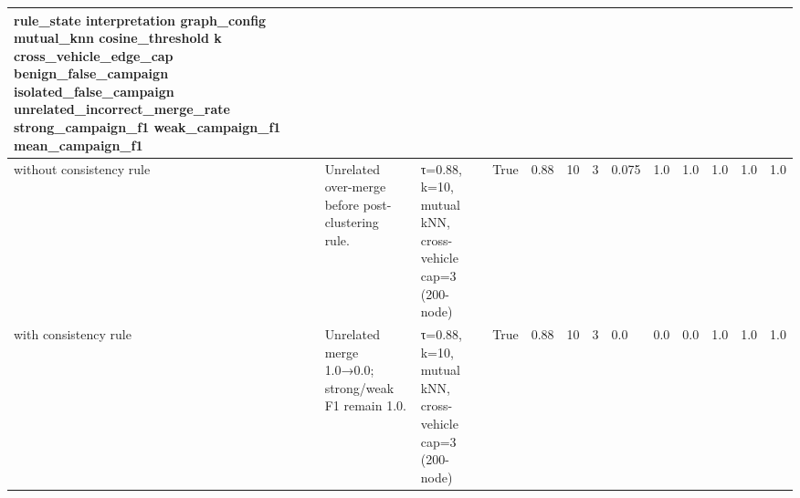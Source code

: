\begin{tabular}{lllllllllllll}
\hline
\textbf{rule_state} \textbf{interpretation} \textbf{graph_config} \textbf{mutual_knn} \textbf{cosine_threshold} \textbf{k} \textbf{cross_vehicle_edge_cap} \textbf{benign_false_campaign} \textbf{isolated_false_campaign} \textbf{unrelated_incorrect_merge_rate} \textbf{strong_campaign_f1} \textbf{weak_campaign_f1} \textbf{mean_campaign_f1} \\
\hline
without consistency rule & Unrelated over-merge before post-clustering rule. & τ=0.88, k=10, mutual kNN, cross-vehicle cap=3 (200-node) & True & 0.88 & 10 & 3 & 0.075 & 1.0 & 1.0 & 1.0 & 1.0 & 1.0 \\
with consistency rule & Unrelated merge 1.0→0.0; strong/weak F1 remain 1.0. & τ=0.88, k=10, mutual kNN, cross-vehicle cap=3 (200-node) & True & 0.88 & 10 & 3 & 0.0 & 0.0 & 0.0 & 1.0 & 1.0 & 1.0 \\
\hline
\end{tabular}
